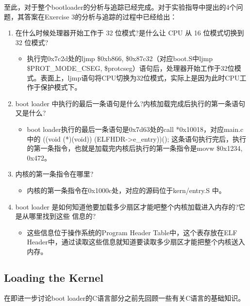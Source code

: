 \par 至此，对于整个bootloader的分析与追踪已经完成。对于实验指导中提出的4个问题，其答案在Exercise 3的分析与追踪的过程中已经给出：
\begin{enumerate}
    \item 在什么时候处理器开始工作于 32 位模式?是什么让 CPU 从 16 位模式切换到 32 位模式?
        \begin{itemize}
            \item 执行完0x7c2d处的ljmp \$0xb866, \$0x87c32（对应boot.S中ljmp \$PROT\_MODE\_CSEG, \$protcseg）语句后，处理器开始工作于32位模式。表面上，ljmp语句将CPU切换为32位模式，实际上是因为此时CPU工作于保护模式下。
        \end{itemize}
    \item boot loader 中执行的最后一条语句是什么?内核加载完成后执行的第一条语句又是什么?
        \begin{itemize}
            \item boot loader执行的最后一条语句是0x7d63处的call *0x10018，对应main.c中的 ((void (*)(void)) (ELFHDR->e\_entry))(); 这条语句执行完后，执行的第一条指令，也就是加载完内核后执行的第一条指令是movw \$0x1234, 0x472。
        \end{itemize}
    \item 内核的第一条指令在哪里?
        \begin{itemize}
            \item 内核的第一条指令在0x1000c处，对应的源码位于kern/entry.S 中。
        \end{itemize}
    \item boot loader 是如何知道他要加载多少扇区才能吧整个内核加载进入内存的?它是从哪里找到这些
        信息的?
        \begin{itemize}
            \item 这些信息位于操作系统的Program Header Table中，这个表存放在ELF Header中，通过读取这些信息就知道要读取多少扇区才能把整个内核送入内存。
        \end{itemize}
\end{enumerate}

\subsection{Loading the Kernel}
\par 在即进一步讨论boot loader的C语言部分之前先回顾一些有关C语言的基础知识。


